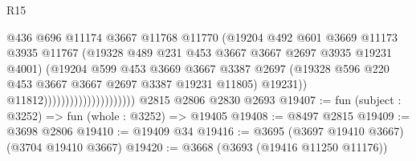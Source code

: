 \begin{lexlean}{R15}
\begin{coremodule}
                                              @436
                                              @696
                                              @11174
                                              @3667
                                              @11768
                                              @11770
                                              (@19204
                                                @492
                                                @601
                                                @3669
                                                @11173
                                                @3935
                                                @11767
                                                (@19328
                                                  @489
                                                  @231
                                                  @453
                                                  @3667
                                                  @3667
                                                  @2697
                                                  @3935
                                                  @19231
                                                  @4001)
                                                (@19204
                                                  @599
                                                  @453
                                                  @3669
                                                  @3667
                                                  @3387
                                                  @2697
                                                  (@19328
                                                    @596
                                                    @220
                                                    @453
                                                    @3667
                                                    @3667
                                                    @2697
                                                    @3387
                                                    @19231
                                                    @11805)
                                                  @19231))
                                              @11812)))))))))))))))))))))
    @2815
    @2806
    @2830
    @2693
@19407 := fun (subject : @3252) => fun (whole : @3252) => @19405
@19408 := @8497 @2815
@19409 := @3698 @2806
@19410 := @19409 @34
@19416 := @3695 (@3697 @19410 @3667) (@3704 @19410 @3667)
@19420 := @3668 (@3693 (@19416 @11250 @11176))

\end{coremodule}
\end{lexlean}
